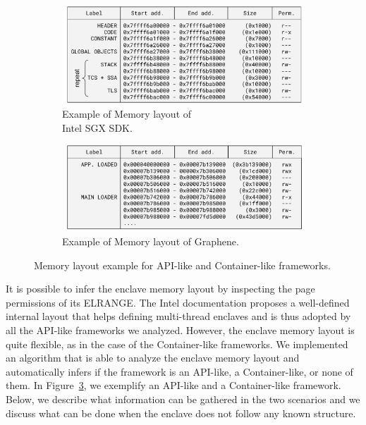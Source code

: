\begin{figure}[t]
	\centering
	\begin{subfigure}[t]{0.49\linewidth}
		\centering
		\includegraphics[width=\textwidth]{fig_c8/memory_layout_api}
		\caption{Example of Memory layout of\\Intel SGX SDK.}
		\label{fig:memory_layout_api}
	\end{subfigure}
	\hfill
	\begin{subfigure}[t]{0.49\linewidth}
		\centering
		\includegraphics[width=\textwidth]{fig_c8/memory_layout_container}
		\caption{Example of Memory layout of Graphene.}
		\label{fig:memory_layout_container}
	\end{subfigure}
	\caption[Memory layout example.]{Memory layout example for API-like and 
	Container-like frameworks.}
	\label{fig:memory_layout}
\end{figure}

It is possible to infer 
the enclave memory layout by inspecting the page permissions of its ELRANGE. 
The Intel documentation proposes a well-defined internal layout that helps 
defining multi-thread enclaves and is thus adopted by all the API-like 
frameworks we analyzed. 
However, the enclave memory layout is quite flexible, as in the case of the 
Container-like frameworks. We implemented an algorithm that is able to analyze 
the enclave memory layout and automatically infers if the framework is an 
API-like, a Container-like, or none of them.
In Figure~\ref{fig:memory_layout}, we exemplify an API-like and a 
Container-like framework.
Below, we describe what information can be gathered in the two scenarios
and we discuss what can be done when the enclave does not follow any known 
structure.

